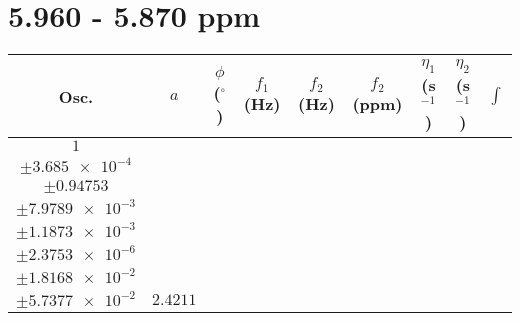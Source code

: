 \documentclass[8pt]{article}
\begin{document}
\section*{5.960 - 5.870 ppm}
\begin{longtable}[l]{c c c c c c c c c}
\toprule
Osc. & $a$ & $\phi$ ($^{\circ}$) & $f_1$ (Hz) & $f_2$ (Hz) & $f_2$ (ppm) & $\eta_1$ (s$^{-1}$) & $\eta_2$ (s$^{-1}$) & $\int$\\
\midrule
$\num{1}$ & \begin{tabular}[c]{@{}c@{}}$\num{3.3711e-2}$ \\ $\pm\num{3.685e-4}$\end{tabular} & \begin{tabular}[c]{@{}c@{}}$\num{-2.5215}$ \\ $\pm\num{0.94753}$\end{tabular} & \begin{tabular}[c]{@{}c@{}}$\num{-7.4859}$ \\ $\pm\num{7.9789e-3}$\end{tabular} & \begin{tabular}[c]{@{}c@{}}$\num{2.9495e+3}$ \\ $\pm\num{1.1873e-3}$\end{tabular} & \begin{tabular}[c]{@{}c@{}}$\num{5.9007}$ \\ $\pm\num{2.3753e-6}$\end{tabular} & \begin{tabular}[c]{@{}c@{}}$\num{2.6554}$ \\ $\pm\num{1.8168e-2}$\end{tabular} & \begin{tabular}[c]{@{}c@{}}$\num{4.8858}$ \\ $\pm\num{5.7377e-2}$\end{tabular} & $\num{2.4211}$\\

\end{longtable}
\end{document}
